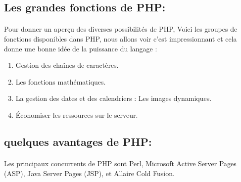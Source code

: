 \subsection{Les grandes fonctions de PHP:}
\paragraph{}
Pour donner un aperçu des diverses possibilités de PHP, Voici les groupes de fonctions disponibles dans PHP, nous allons voir c’est impressionnant et cela donne une bonne idée de la puissance du langage :
\begin{enumerate}
	\item Gestion des chaînes de caractères.
	\item Les fonctions mathématiques.
	\item La gestion des dates et des calendriers : Les images dynamiques.
	\item Économiser les ressources sur le serveur.
\end{enumerate}

\subsection{quelques avantages de PHP:}
\paragraph{}
Les principaux concurrents de PHP sont Perl, Microsoft Active Server
Pages (ASP), Java Server Pages (JSP), et Allaire Cold Fusion.

